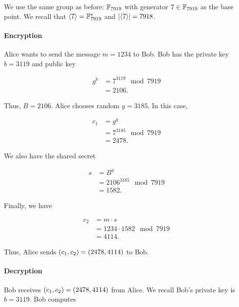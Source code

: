 \begin{example}

We use the same \gls{group} as before:
$\mathbb{F}_{7919}$ with generator $7\in\mathbb{F}_{7919}$ as the base point.
We recall that $\left\langle 7 \right\rangle = \mathbb{F}_{7919}^{*}$ and $\left| \left\langle 7 \right\rangle \right| = 7918$.

\paragraph{Encryption}
Alice wants to send the message $m = 1234$ to Bob.
Bob has the private key $b = 3119$ and public key

\begin{align}
    g^{b} &= 7^{3119} \mod 7919 \nonumber\\
        &= 2106.
\end{align}

\noindent
Thus, $B = 2106$.
Alice chooses random $y = 3185$.
In this case,

\begin{align}
    c_{1} &= g^{y} \nonumber\\
        &= 7^{3185} \mod 7919 \nonumber\\
        &= 2478.
\end{align}

\noindent
We also have the \gls{shared secret}

\begin{align}
    s &= B^{y} \nonumber\\
        &= 2106^{3185} \mod 7919 \nonumber\\
        &= 1582.
\end{align}

\noindent
Finally, we have

\begin{align}
    c_{2} &= m\cdot s \nonumber\\
        &= 1234\cdot 1582 \mod 7919 \nonumber\\
        &= 4114.
\end{align}

\noindent
Thus, Alice sends $\left( c_{1},c_{2} \right) = \left( 2478,4114 \right)$ to Bob.

\paragraph{Decryption}
Bob receives $\left( c_{1},c_{2} \right) = \left( 2478,4114 \right)$ from Alice.
We recall Bob's private key is $b = 3119$.
Bob computes


\end{example}
